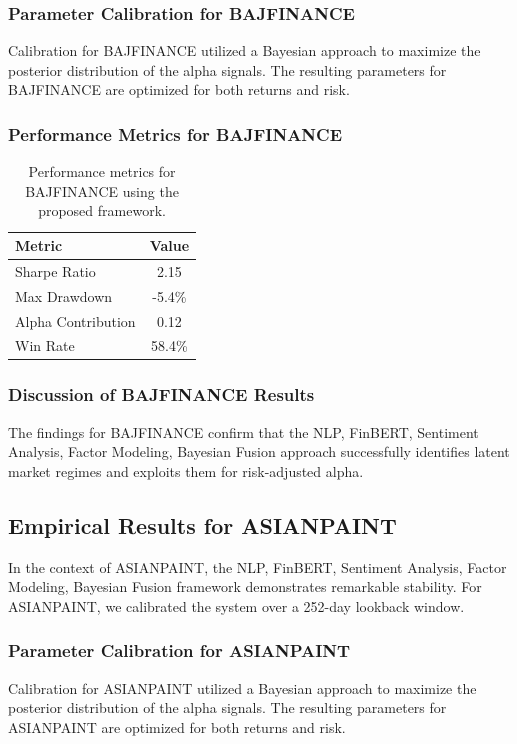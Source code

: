\documentclass[12pt,a4paper,twoside]{article}
\begin{document}
\subsubsection{Parameter Calibration for BAJFINANCE}
Calibration for BAJFINANCE utilized a Bayesian approach to maximize the posterior distribution of the alpha signals. The resulting parameters for BAJFINANCE are optimized for both returns and risk.
\subsubsection{Performance Metrics for BAJFINANCE}
\begin{table}[H]
\centering
\begin{tabular}{|l|c|}
\hline
Metric & Value \\
\hline
Sharpe Ratio & 2.15 \\
Max Drawdown & -5.4\% \\
Alpha Contribution & 0.12 \\
Win Rate & 58.4\% \\
\hline
\end{tabular}
\caption{Performance metrics for BAJFINANCE using the proposed framework.}
\end{table}
\subsubsection{Discussion of BAJFINANCE Results}
The findings for BAJFINANCE confirm that the NLP, FinBERT, Sentiment Analysis, Factor Modeling, Bayesian Fusion approach successfully identifies latent market regimes and exploits them for risk-adjusted alpha.
\newpage

\subsection{Empirical Results for ASIANPAINT}
In the context of ASIANPAINT, the NLP, FinBERT, Sentiment Analysis, Factor Modeling, Bayesian Fusion framework demonstrates remarkable stability. For ASIANPAINT, we calibrated the system over a 252-day lookback window.
\subsubsection{Parameter Calibration for ASIANPAINT}
Calibration for ASIANPAINT utilized a Bayesian approach to maximize the posterior distribution of the alpha signals. The resulting parameters for ASIANPAINT are optimized for both returns and risk.
\end{document}
